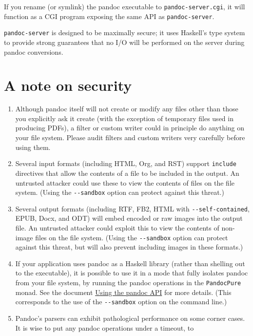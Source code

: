 \documentclass[
]{article}
\begin{document}
If you rename (or symlink) the pandoc executable to
\texttt{pandoc-server.cgi}, it will function as a CGI program exposing
the same API as \texttt{pandoc-server}.

\texttt{pandoc-server} is designed to be maximally secure; it uses
Haskell's type system to provide strong guarantees that no I/O will be
performed on the server during pandoc conversions.

\section{A note on security}\label{a-note-on-security}

\begin{enumerate}
\def\labelenumi{\arabic{enumi}.}
\item
  Although pandoc itself will not create or modify any files other than
  those you explicitly ask it create (with the exception of temporary
  files used in producing PDFs), a filter or custom writer could in
  principle do anything on your file system. Please audit filters and
  custom writers very carefully before using them.
\item
  Several input formats (including HTML, Org, and RST) support
  \texttt{include} directives that allow the contents of a file to be
  included in the output. An untrusted attacker could use these to view
  the contents of files on the file system. (Using the
  \texttt{-\/-sandbox} option can protect against this threat.)
\item
  Several output formats (including RTF, FB2, HTML with
  \texttt{-\/-self-contained}, EPUB, Docx, and ODT) will embed encoded
  or raw images into the output file. An untrusted attacker could
  exploit this to view the contents of non-image files on the file
  system. (Using the \texttt{-\/-sandbox} option can protect against
  this threat, but will also prevent including images in these formats.)
\item
  If your application uses pandoc as a Haskell library (rather than
  shelling out to the executable), it is possible to use it in a mode
  that fully isolates pandoc from your file system, by running the
  pandoc operations in the \texttt{PandocPure} monad. See the document
  \href{https://pandoc.org/using-the-pandoc-api.html}{Using the pandoc
  API} for more details. (This corresponds to the use of the
  \texttt{-\/-sandbox} option on the command line.)
\item
  Pandoc's parsers can exhibit pathological performance on some corner
  cases. It is wise to put any pandoc operations under a timeout, to

\end{enumerate}
\end{document}
